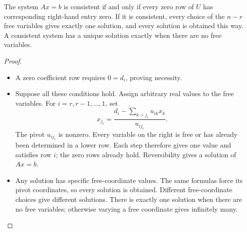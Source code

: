 \begin{theorem}\label{thm:01:consistency}
The system \(Ax=b\) is consistent if and only if every zero row of
\(U\) has corresponding right-hand entry zero. If it is consistent,
every choice of the \(n-r\) free variables gives exactly one solution,
and every solution is obtained this way. A consistent system has a unique
solution exactly when there are no free variables.
\end{theorem}
\begin{proof}
\begin{itemize}
\item A zero coefficient row requires \(0=d_i\), proving necessity.
\item {}Suppose all these conditions hold. Assign arbitrary real values to the
free variables. For \(i=r,r-1,\ldots,1\), set
\[
\boxed{x_{j_i}=\frac{d_i-\sum_{k>j_i}u_{ik}x_k}{u_{i j_i}}.}
\]
The pivot \(u_{i j_i}\) is nonzero. Every variable on the right is free
or has already been determined in a lower row. Each step therefore gives
one value and satisfies row \(i\); the zero rows already hold.
Reversibility gives a solution of \(Ax=b\).
\item {}Any solution has specific free-coordinate values. The same formulas
force its pivot coordinates, so every solution is obtained.
Different free-coordinate choices give different solutions.
There is exactly one solution when there are no free variables;
otherwise varying a free coordinate gives infinitely many.
\end{itemize}
\end{proof}

